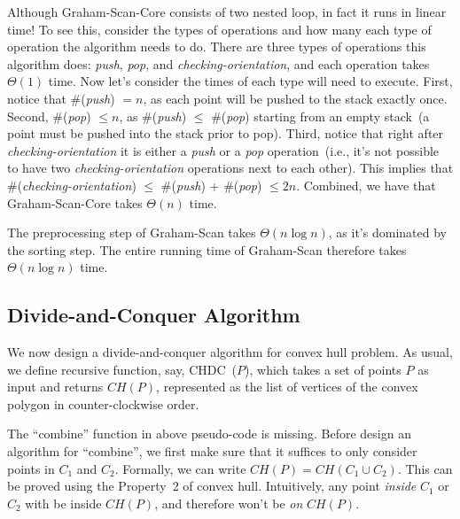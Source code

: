 Although Graham-Scan-Core consists of two nested loop, in fact it runs in linear time!
To see this, consider the types of operations and how many each type of operation
the algorithm needs to do.  There are three types of operations this algorithm does: \emph{push}, \emph{pop}, and \emph{checking-orientation},
and each operation takes $\Theta(1)$ time. Now let's consider the times of each type will need to execute.
First, notice that \#(\emph{push}) $= n$, as each point will be pushed to the stack exactly once.
Second, \#(\emph{pop}) $\le n$, as \#(\emph{push}) $\le$ \#(\emph{pop}) starting from an empty stack~(a point must be pushed into the stack prior to pop).
Third, notice that right after \emph{checking-orientation} it is either a \emph{push} or a \emph{pop} operation~(i.e.,
it's not possible to have two \emph{checking-orientation} operations next to each other).
This implies that \#(\emph{checking-orientation}) $\le$ \#(\emph{push}) + \#(\emph{pop}) $\le 2n$.
Combined, we have that Graham-Scan-Core takes $\Theta(n)$ time.

The preprocessing step of Graham-Scan takes $\Theta(n \log n)$, as it's dominated by the sorting step.
The entire running time of Graham-Scan therefore takes $\Theta(n \log n)$ time.

\subsection*{Divide-and-Conquer Algorithm}

We now design a divide-and-conquer algorithm for convex hull problem.
As usual, we define recursive function, say, CHDC~($P$), which takes
a set of points $P$ as input and returns $CH(P)$, represented
as the list of vertices of the convex polygon in counter-clockwise order.

\begin{minipage}{0.8\textwidth}
	\xxx
	\xxx
	\xxx
	\xxx
	\xxx
	\xxx
\end{minipage}

The ``combine'' function in above pseudo-code is missing.
Before design an algorithm for ``combine'', we first make sure that
it suffices to only consider points in $C_1$ and $C_2$. Formally,
we can write $CH(P) = CH(C_1\cup C_2)$. This can be proved using the
Property~2 of convex hull. Intuitively, any point \emph{inside} $C_1$ or $C_2$
with be inside $CH(P)$, and therefore won't be \emph{on} $CH(P)$.

